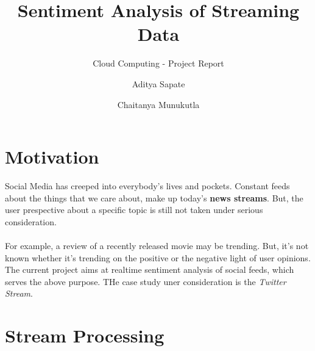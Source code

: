 \documentclass{llncs}
\begin{document}
\title{Sentiment Analysis of Streaming Data}


\subtitle{Cloud Computing - Project Report}


\author{Aditya Sapate \and Chaitanya Munukutla}







\maketitle

\section{Motivation}
Social Media has creeped into everybody's lives and pockets. Constant feeds about the things that we care about, make up today's \textbf{news streams}. But, the user prespective about a specific topic is still not taken under serious consideration. \\ \\ For example, a review of a recently released movie may be trending. But, it's not known whether it's trending on the positive or the negative light of user opinions. The current project aims at realtime sentiment analysis of social feeds, which serves the above purpose. THe case study uner consideration is the \emph{Twitter Stream}.

\section{Stream Processing}
\end{document}
